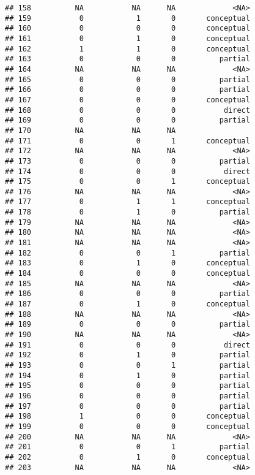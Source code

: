 \documentclass[
  english,
  man]{apa6}
\begin{document}
\begin{verbatim}
## 158          NA           NA      NA             <NA>
## 159           0            1       0       conceptual
## 160           0            0       0       conceptual
## 161           0            1       0       conceptual
## 162           1            1       0       conceptual
## 163           0            0       0          partial
## 164          NA           NA      NA             <NA>
## 165           0            0       0          partial
## 166           0            0       0          partial
## 167           0            0       0       conceptual
## 168           0            0       0           direct
## 169           0            0       0          partial
## 170          NA           NA      NA                 
## 171           0            0       1       conceptual
## 172          NA           NA      NA             <NA>
## 173           0            0       0          partial
## 174           0            0       0           direct
## 175           0            0       1       conceptual
## 176          NA           NA      NA             <NA>
## 177           0            1       1       conceptual
## 178           0            1       0          partial
## 179          NA           NA      NA             <NA>
## 180          NA           NA      NA             <NA>
## 181          NA           NA      NA             <NA>
## 182           0            0       1          partial
## 183           0            1       0       conceptual
## 184           0            0       0       conceptual
## 185          NA           NA      NA             <NA>
## 186           0            0       0          partial
## 187           0            1       0       conceptual
## 188          NA           NA      NA             <NA>
## 189           0            0       0          partial
## 190          NA           NA      NA             <NA>
## 191           0            0       0           direct
## 192           0            1       0          partial
## 193           0            0       1          partial
## 194           0            1       0          partial
## 195           0            0       0          partial
## 196           0            0       0          partial
## 197           0            0       0          partial
## 198           1            0       0       conceptual
## 199           0            0       0       conceptual
## 200          NA           NA      NA             <NA>
## 201           0            0       1          partial
## 202           0            1       0       conceptual
## 203          NA           NA      NA             <NA>

\end{verbatim}
\end{document}
